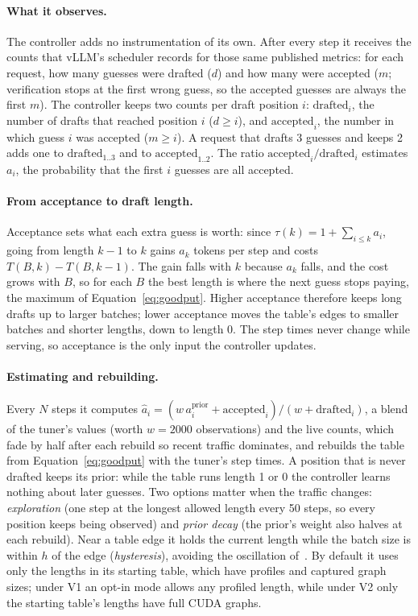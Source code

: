 \documentclass{article}
\newcommand{\term}[1]{\emph{#1}}
\begin{document}
\paragraph{What it observes.} The controller adds no instrumentation of its own. After every step it receives the counts that vLLM's scheduler records for those same published metrics: for each request, how many guesses were drafted ($d$) and how many were accepted ($m$; verification stops at the first wrong guess, so the accepted guesses are always the first $m$). The controller keeps two counts per draft position $i$: $\text{drafted}_i$, the number of drafts that reached position $i$ ($d \ge i$), and $\text{accepted}_i$, the number in which guess $i$ was accepted ($m \ge i$). A request that drafts 3 guesses and keeps 2 adds one to $\text{drafted}_{1..3}$ and to $\text{accepted}_{1..2}$. The ratio $\text{accepted}_i/\text{drafted}_i$ estimates $a_i$, the probability that the first $i$ guesses are all accepted.

\paragraph{From acceptance to draft length.} Acceptance sets what each extra guess is worth: since $\tau(k) = 1 + \sum_{i\le k} a_i$, going from length $k-1$ to $k$ gains $a_k$ tokens per step and costs $T(B,k) - T(B,k-1)$. The gain falls with $k$ because $a_k$ falls, and the cost grows with $B$, so for each $B$ the best length is where the next guess stops paying, the maximum of Equation~\ref{eq:goodput}. Higher acceptance therefore keeps long drafts up to larger batches; lower acceptance moves the table's edges to smaller batches and shorter lengths, down to length 0. The step times never change while serving, so acceptance is the only input the controller updates.

\paragraph{Estimating and rebuilding.} Every $N$ steps it computes $\hat a_i = (w\, a_i^{\text{prior}} + \text{accepted}_i)/(w + \text{drafted}_i)$, a blend of the tuner's values (worth $w=2000$ observations) and the live counts, which fade by half after each rebuild so recent traffic dominates, and rebuilds the table from Equation~\ref{eq:goodput} with the tuner's step times. A position that is never drafted keeps its prior: while the table runs length 1 or 0 the controller learns nothing about later guesses. Two options matter when the traffic changes: \emph{exploration} (one step at the longest allowed length every 50 steps, so every position keeps being observed) and \emph{prior decay} (the prior's weight also halves at each rebuild). Near a table edge it holds the current length while the batch size is within $h$ of the edge (\term{hysteresis}), avoiding the oscillation of~\cite{vllm2026issue49548}. By default it uses only the lengths in its starting table, which have profiles and captured graph sizes; under V1 an opt-in mode allows any profiled length, while under V2 only the starting table's lengths have full CUDA graphs.
\end{document}
